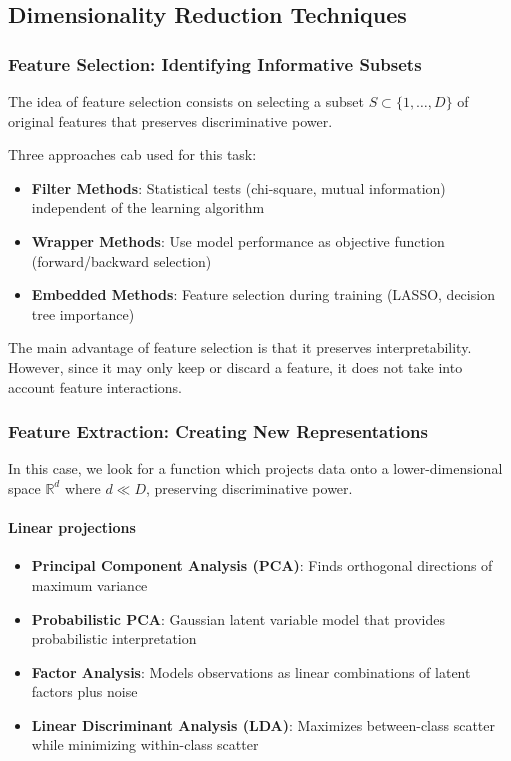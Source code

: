 
\subsection*{Dimensionality Reduction Techniques}

\subsubsection*{Feature Selection: Identifying Informative Subsets}
The idea of feature selection consists on selecting a subset $S \subset \{1,\ldots,D\}$ of original features that preserves discriminative power. 

Three approaches cab used for this task:
\begin{itemize}
    \item \textbf{Filter Methods}: Statistical tests (chi-square, mutual information) independent of the learning algorithm
    \item \textbf{Wrapper Methods}: Use model performance as objective function (forward/backward selection)
    \item \textbf{Embedded Methods}: Feature selection during training (LASSO, decision tree importance)
\end{itemize}

The main advantage of feature selection is that it preserves interpretability. However, since it may only keep or discard a feature, it does not take into account  feature interactions.

\subsubsection*{Feature Extraction: Creating New Representations}
In this case, we look for a function which projects data onto a lower-dimensional space $\mathbb{R}^d$ where $d \ll D$, preserving discriminative power.

\paragraph{Linear projections}
\begin{itemize}
    \item \textbf{Principal Component Analysis (PCA)}: Finds orthogonal directions of maximum variance
    \item \textbf{Probabilistic PCA}: Gaussian latent variable model that provides probabilistic interpretation
    \item \textbf{Factor Analysis}: Models observations as linear combinations of latent factors plus noise
    \item \textbf{Linear Discriminant Analysis (LDA)}: Maximizes between-class scatter while minimizing within-class scatter
\end{itemize}

